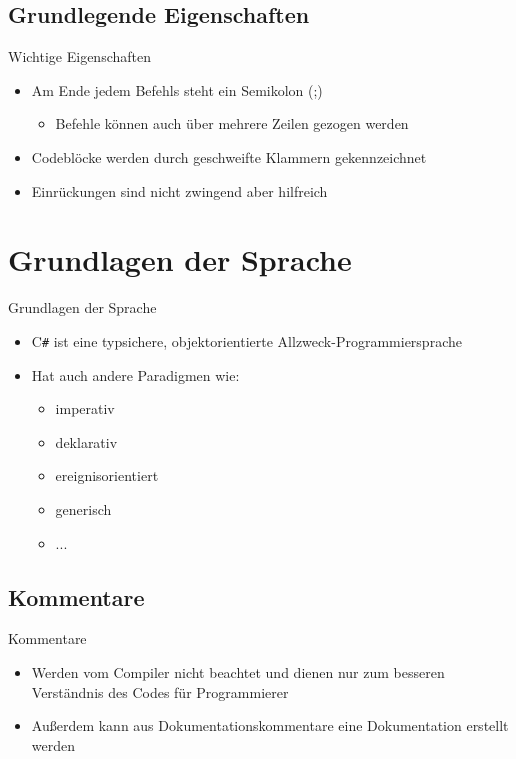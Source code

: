 \subsection{Grundlegende Eigenschaften}
\begin{frame}{Wichtige Eigenschaften}
	\begin{itemize}
		\item Am Ende jedem Befehls steht ein Semikolon (;)
		\begin{itemize}
			\item Befehle können auch über mehrere Zeilen gezogen werden
		\end{itemize}
		\item Codeblöcke werden durch geschweifte Klammern gekennzeichnet
		\item Einrückungen sind nicht zwingend aber hilfreich
	\end{itemize}
\end{frame}

\section{Grundlagen der Sprache}
\begin{frame}{Grundlagen der Sprache}
	\begin{itemize}
		\item C\texttt{\#} ist eine typsichere, objektorientierte Allzweck-Programmiersprache	
		\item Hat auch andere Paradigmen wie:
		\begin{itemize}
			\item imperativ
			\item deklarativ
			\item ereignisorientiert
			\item generisch
			\item ...
		\end{itemize}
	\end{itemize}	
\end{frame}

\subsection{Kommentare}
\begin{frame}{Kommentare}
	\begin{itemize}
		\item Werden vom Compiler nicht beachtet und dienen nur zum besseren Verständnis des Codes für Programmierer
		\item Außerdem kann aus Dokumentationskommentare eine Dokumentation erstellt werden
	\end{itemize}
	
\end{frame}

